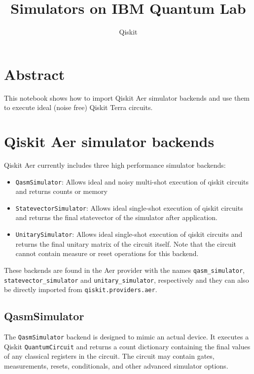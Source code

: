 \documentclass[a4paper,num-refs]{oup-contemporary}
\title{Simulators on IBM Quantum Lab}
\author{Qiskit}
\begin{document}
\begin{frontmatter}
\maketitle
\end{frontmatter}

\section{Abstract}
This notebook shows how to import Qiskit Aer simulator backends and use them to execute ideal (noise free) Qiskit Terra circuits.

\section{Qiskit Aer simulator backends}

Qiskit Aer currently includes three high performance simulator backends:
\begin{itemize}
    \item \verb|QasmSimulator|: Allows ideal and noisy multi-shot execution of qiskit circuits and returns counts or memory 
    \item \verb|StatevectorSimulator|: Allows ideal single-shot execution of qiskit circuits and returns the final statevector of the simulator after application.
    \item \verb|UnitarySimulator|: Allows ideal single-shot execution of qiskit circuits and returns the final unitary matrix of the circuit itself. Note that the circuit cannot contain measure or reset operations for this backend.
\end{itemize}

These backends are found in the Aer provider with the names \verb|qasm_simulator|, \verb|statevector_simulator| and \verb|unitary_simulator|, respectively and they can also be directly imported from \verb|qiskit.providers.aer|.

\subsection{QasmSimulator}
The \verb|QasmSimulator| backend is designed to mimic an actual device. It executes a Qiskit \verb|QuantumCircuit| and returns a count dictionary containing the final values of any classical registers in the circuit. The circuit may contain gates, measurements, resets, conditionals, and other advanced simulator options.
\end{document}
